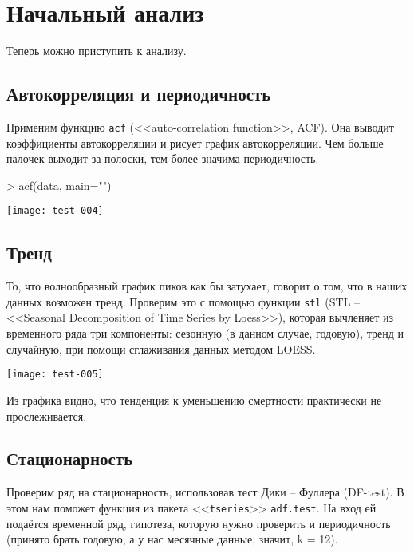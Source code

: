 \documentclass[a4paper]{extarticle}
\begin{document}
\section{Начальный анализ}

Теперь можно приступить к анализу. 
\subsection{Автокорреляция и периодичность}
Применим функцию \texttt{acf} (<<auto-correlation function>>, ACF). Она выводит коэффициенты автокорреляции и рисует график автокорреляции. Чем больше палочек выходит за полоски, тем более значима периодичность.

\begin{Schunk}
\begin{Sinput}
> acf(data, main="")
\end{Sinput}
\end{Schunk}
\texttt{[image: test-004]}

\subsection{Тренд}

То, что волнообразный график пиков как бы затухает, говорит о том, что в наших данных возможен тренд. Проверим это с помощью функции \texttt{stl} (STL -- <<Seasonal Decomposition of Time Series by Loess>>), которая вычленяет из временного ряда три компоненты: сезонную (в данном случае, годовую), тренд и случайную, при помощи сглаживания данных методом LOESS.

\begin{Schunk}
\end{Schunk}
\texttt{[image: test-005]}

Из графика видно, что тенденция к уменьшению смертности практически не прослеживается.

\subsection{Стационарность}

Проверим ряд на стационарность, использовав тест Дики -- Фуллера (DF-test). В этом нам поможет функция из пакета <<\texttt{tseries}>> \texttt{adf.test}. На вход ей подаётся временной ряд, гипотеза, которую нужно проверить и периодичность (принято брать годовую, а у нас месячные данные, значит, k = 12).
\end{document}
